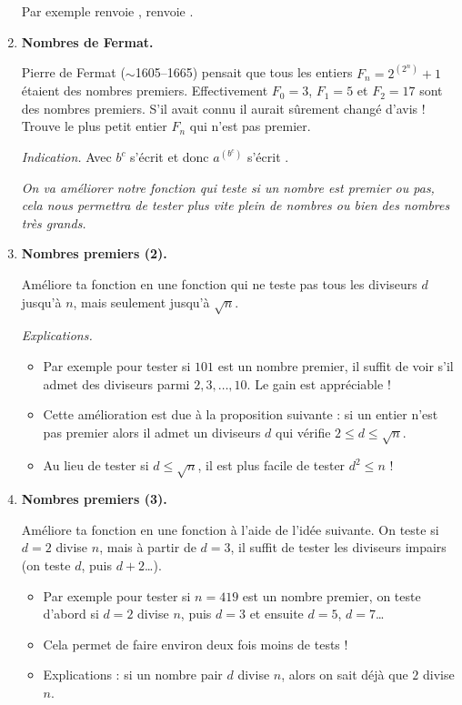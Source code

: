 \documentclass[11pt,class=report,crop=false]{standalone}
\begin{document}
\begin{activite}
\begin{enumerate}
  Par exemple  renvoie ,  renvoie .
  
  \item \textbf{Nombres de Fermat.}
  
  Pierre de Fermat ($\sim$1605--1665) pensait que tous les entiers $F_n = 2^{(2^n)}+1$ étaient des nombres premiers. Effectivement $F_0=3$, $F_1=5$ et $F_2=17$
  sont des nombres premiers. S'il avait connu \Python{} il aurait sûrement changé d'avis ! Trouve le plus petit entier $F_n$ qui n'est pas premier.
  
  \emph{Indication.} Avec \Python{} $b^c$ s'écrit  et donc
  $a^{(b^c)}$ s'écrit .
  
  \medskip
  
  \emph{On va améliorer notre fonction qui teste si un nombre est premier ou pas, cela nous permettra de tester plus vite plein de nombres ou bien des nombres très grands.}  
  
  \item \textbf{Nombres premiers (2).}
  
   Améliore ta fonction en une fonction  qui ne teste pas tous les diviseurs $d$ jusqu'à $n$, mais seulement jusqu'à $\sqrt{n}$.
   
  \emph{Explications.}
  \begin{itemize}
    \item Par exemple pour tester si $101$ est un nombre premier, il suffit de voir s'il admet des diviseurs parmi $2,3,\ldots,10$. Le gain est appréciable !
    
    \item Cette amélioration est due à la proposition suivante : si un entier n'est pas premier alors il admet un diviseurs $d$ qui vérifie $2 \le d \le \sqrt{n}$.
    
    \item Au lieu de tester si $d \le \sqrt{n}$, il est plus facile de tester $d^2 \le n$ !
   \end{itemize} 
  
  
  \item \textbf{Nombres premiers (3).}  
  
  Améliore ta fonction en une fonction  à l'aide de l'idée suivante.  On teste si $d=2$ divise $n$, mais à partir de $d=3$, il suffit de tester les diviseurs impairs (on teste $d$, puis $d+2$\ldots).
 
 \begin{itemize}
   \item Par exemple pour tester si $n = 419$ est un nombre premier, on teste d'abord si $d=2$ divise $n$, puis $d=3$ et ensuite $d=5$, $d=7$\ldots 
   \item Cela permet de faire environ deux fois moins de tests !
   \item Explications : si un nombre pair $d$ divise $n$, alors on sait déjà que $2$ divise $n$.   
   \end{itemize}
  

\end{enumerate}
\end{activite}
\end{document}
